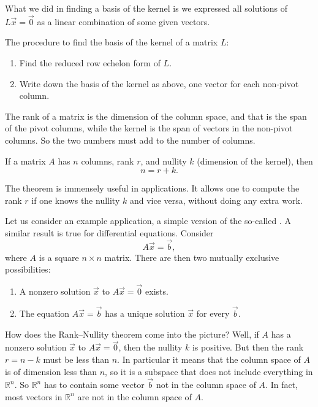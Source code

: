 \documentclass{ximera}
\begin{document}
What we did in finding a basis of the kernel is we expressed all solutions of $L \vec{x} = \vec{0}$ as a linear combination of some given vectors.


The procedure to find the basis of the kernel of a matrix $L$:
\begin{enumerate}
    \item Find the reduced row echelon form of $L$.
    \item Write down the basis of the kernel as above, one vector for each non-pivot column.
\end{enumerate}


The rank of a matrix is the dimension of the column space, and that is the span of the pivot columns, while the kernel is the span of vectors in the non-pivot columns.  So the two numbers must add to the number of columns.

\begin{theorem}
    If a matrix $A$ has $n$ columns, rank $r$, and nullity $k$ (dimension of the kernel), then
    \begin{equation*}
        n = r+k .
    \end{equation*}
\end{theorem}

The theorem is immensely useful in applications.  It allows one to compute the rank $r$ if one knows the nullity $k$ and vice versa, without doing any extra work.

Let us consider an example application, a simple version of the so-called \emph{}.  A similar result is true for differential equations.  Consider
\begin{equation*}
    A \vec{x} = \vec{b} ,
\end{equation*}
where $A$ is a square $n \times n$ matrix. There are then two mutually exclusive possibilities:
\begin{enumerate}
    \item A nonzero solution $\vec{x}$ to $A \vec{x} = \vec{0}$ exists.
    \item The equation $A \vec{x} = \vec{b}$ has a unique solution $\vec{x}$ for every $\vec{b}$.
\end{enumerate}
How does the Rank--Nullity theorem come into the picture?  Well, if $A$ has a nonzero solution $\vec{x}$ to $A \vec{x} = \vec{0}$, then the nullity $k$ is positive.  But then the rank $r = n-k$ must be less than $n$.  In particular it means that the column space of $A$ is of dimension less than $n$, so it is a subspace that does not include everything in ${\mathbb{R}}^n$. So ${\mathbb{R}}^n$ has to contain some vector $\vec{b}$ not in the column space of $A$.  In fact, most vectors in ${\mathbb{R}}^n$ are not in the column space of $A$.
\end{document}
